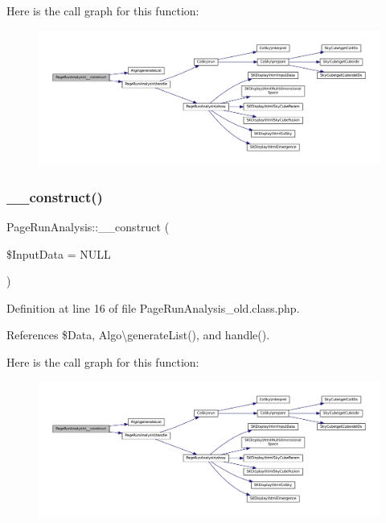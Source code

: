Here is the call graph for this function\+:
\nopagebreak
\begin{figure}[H]
\begin{center}
\leavevmode
\includegraphics[width=350pt]{class_page_run_analysis_a55b883af577385e55cb40c5420e0a692_cgraph}
\end{center}
\end{figure}
\mbox{\label{class_page_run_analysis_a55b883af577385e55cb40c5420e0a692}} 
\subsubsection{\texorpdfstring{\+\_\+\+\_\+construct()}{\_\_construct()}\hspace{0.1cm}{\footnotesize\ttfamily [2/2]}}
{\footnotesize\ttfamily Page\+Run\+Analysis\+::\+\_\+\+\_\+construct (\begin{DoxyParamCaption}\item[{}]{\$\+Input\+Data = {\ttfamily NULL} }\end{DoxyParamCaption})}



Definition at line 16 of file Page\+Run\+Analysis\+\_\+old.\+class.\+php.



References \$\+Data, Algo\textbackslash{}generate\+List(), and handle().

Here is the call graph for this function\+:
\nopagebreak
\begin{figure}[H]
\begin{center}
\leavevmode
\includegraphics[width=350pt]{class_page_run_analysis_a55b883af577385e55cb40c5420e0a692_cgraph}
\end{center}
\end{figure}


